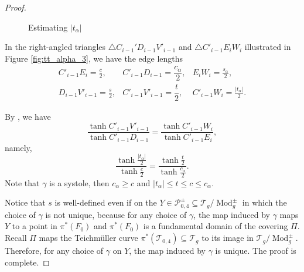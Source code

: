 \documentclass[UTF8]{amsart}
\numberwithin{equation}{section}
\theoremstyle{definition}
\theoremstyle{example}
\theoremstyle{remark}
\DeclareMathOperator{\modo}{Mod}
\begin{document}
\begin{proof}
\begin{figure}[htbp]
 \caption{Estimating $|t_{\alpha}|$}
 \label{fig:tt_alpha}
\end{figure}

In the right-angled triangles $\triangle C_{i-1}' D_{i-1} V'_{i-1}$ and $\triangle C'_{i-1}E_iW_i$ illustrated in Figure \ref{fig:tt_alpha_3}, we have the edge lengths
 \begin{eqnarray*}
  C'_{i-1}E_i = \frac{c}{2}, & C'_{i-1}D_{i-1} = \dfrac{c_{\alpha}}{2}, & E_iW_i = \frac{s_{\alpha}}{2}, \\
  D_{i-1}V'_{i-1} = \frac{s}{2}, & C'_{i-1}V'_{i-1} = \dfrac{t}{2}, & C'_{i-1}W_i = \frac{|t_{\alpha}|}{2}. 
 \end{eqnarray*}

 By \cite[Page 454, 2.2.2 (vi)]{buser2010geometry}, we have
 \[
  \frac{\tanh C'_{i-1}V'_{i-1}}{\tanh C'_{i-1}D_{i-1}} = \frac{\tanh C'_{i-1} W_i}{\tanh C'_{i-1} E_i}, 
 \]
 namely, 
 \[
  \frac{\tanh \frac{|t_{\alpha}|}{2}}{\tanh \frac{c}{2}} = \frac{\tanh \frac{t}{2}}{\tanh \frac{c_{\alpha}}{2}}. 
 \]
 Note that $\gamma$ is a systole, then $c_{\alpha} \ge c$ and $|t_{\alpha}| \le t \le c \le c_{\alpha}$. 

 Notice that $s$ is well-defined even if on the $Y\in \mathcal{P}^{\pm}_{0,4} \subseteq \mathcal{T}_g/ \modo^{\pm}_g$ in which the choice of $\gamma$ is not unique, because for any choice of $\gamma$, the map induced by $\gamma$ maps $Y$ to a point in $\pi^{*}(F_0)$ and $\pi^{*}(F_0)$ is a fundamental domain of the covering $\Pi$. Recall $\Pi$ maps the Teichm\"uller curve $\pi^{*}(\mathcal{T}_{0,4}) \subseteq \mathcal{T}_g$ to its image in $\mathcal{T}_g/ \modo_g^{\pm}$. Therefore, for any choice of $\gamma$ on $Y$, the map induced by $\gamma$ is unique. 
 The proof is complete. 
\end{proof}
\end{document}
